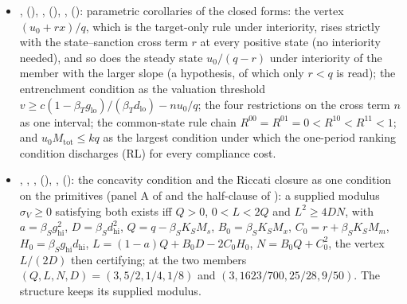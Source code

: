 \begin{itemize}[leftmargin=1.4em,itemsep=1pt]
\item {},  (), ,  (), ,  (): parametric corollaries of the closed forms: the vertex $(u_0+rx)/q$, which is the target-only rule under interiority, rises strictly with the state--sanction cross term $r$ at every positive state (no interiority needed), and so does the steady state $u_0/(q-r)$ under interiority of the member with the larger slope (a hypothesis, of which only $r<q$ is read); the entrenchment condition as the valuation threshold $v\ge c(1-\beta_Tg_{\mathrm{lo}})/(\beta_Td_{\mathrm{lo}})-nu_0/q$; the four restrictions on the cross term $n$ as one interval; the common-state rule chain $R^{00}=R^{01}=0<R^{10}<R^{11}<1$; and $u_0M_{\mathrm{tot}}\le kq$ as the largest condition under which the one-period ranking condition discharges (RL) for every compliance cost.
\item {}, , ,  (), ,  (): the concavity condition and the Riccati closure as one condition on the primitives (panel A of  and the half-clause of ): a supplied modulus $\sigma_V\ge0$ satisfying both exists iff $Q>0$, $0<L<2Q$ and $L^2\ge4DN$, with $a=\beta_Sg_{\mathrm{hi}}^2$, $D=\beta_Sd_{\mathrm{hi}}^2$, $Q=q-\beta_SK_SM_s$, $B_0=\beta_SK_SM_x$, $C_0=r+\beta_SK_SM_m$, $H_0=\beta_Sg_{\mathrm{hi}}d_{\mathrm{hi}}$, $L=(1-a)Q+B_0D-2C_0H_0$, $N=B_0Q+C_0^2$, the vertex $L/(2D)$ then certifying; at the two members $(Q,L,N,D)=(3,5/2,1/4,1/8)$ and $(3,1623/700,25/28,9/50)$. The structure keeps its supplied modulus.

\end{itemize}
